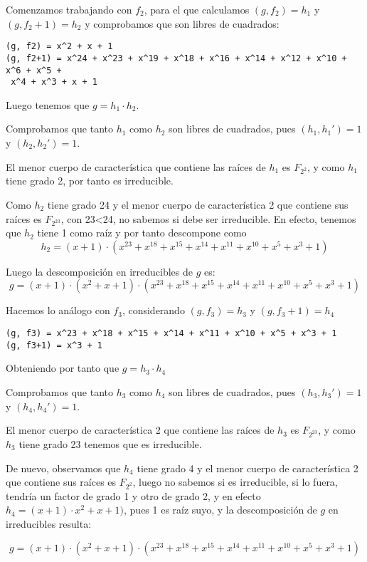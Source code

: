 \documentclass[a4paper]{article}
\begin{document}
Comenzamos trabajando con $f_2$, para el que calculamos $(g, f_2) =h_1$ y $(g, f_2+1)=h_2$ y comprobamos que son libres de cuadrados:

\begin{verbatim}
(g, f2) = x^2 + x + 1
(g, f2+1) = x^24 + x^23 + x^19 + x^18 + x^16 + x^14 + x^12 + x^10 + x^6 + x^5 +
 x^4 + x^3 + x + 1
\end{verbatim}

Luego tenemos que $g=h_1\cdot h_2$.

Comprobamos que tanto $h_1$ como $h_2$ son libres de cuadrados, pues $(h_1,h_1')=1$ y $(h_2,h_2')=1$.

El menor cuerpo  de característica que contiene las raíces de $h_1$ es $F_{2^{2}}$, y como $h_1$ tiene grado 2, por tanto es irreducible.

Como $h_2$ tiene grado 24 y el menor cuerpo de característica 2 que contiene sus raíces es $F_{2^{23}}$, con 23<24, no sabemos si debe ser irreducible. En efecto, tenemos que $h_2$ tiene 1 como raíz y por tanto descompone como 
$$h_2=(x+1)\cdot (x^{23}+x^{18}+x^{15}+x^{14}+x^{11}+x^{10}+x^5+x^3+1)$$

Luego la descomposición en irreducibles de $g$ es:
$$g=(x+1)\cdot (x^2+x+1) \cdot (x^{23}+x^{18}+x^{15}+x^{14}+x^{11}+x^{10}+x^5+x^3+1)$$

Hacemos lo análogo con $f_3$, considerando $(g, f_3) =h_3$ y $(g, f_3+1)=h_4$ 

\begin{verbatim}
(g, f3) = x^23 + x^18 + x^15 + x^14 + x^11 + x^10 + x^5 + x^3 + 1
(g, f3+1) = x^3 + 1
\end{verbatim}

Obteniendo por tanto que $g=h_3\cdot h_4$

Comprobamos que tanto $h_3$ como $h_4$ son libres de cuadrados, pues $(h_3,h_3')=1$ y $(h_4,h_4')=1$.

El menor cuerpo de característica 2 que contiene las raíces de $h_3$ es $F_{2^{23}}$, y como $h_3$ tiene grado 23 tenemos que es irreducible.

De nuevo, observamos que $h_4$ tiene grado 4 y el menor cuerpo de característica 2 que contiene sus raíces es $F_{2^{2}}$, luego no sabemos si es irreducible, si lo fuera, tendría un factor de grado 1 y otro de grado 2, y en efecto $h_4=(x+1)\cdot x^2+x+1)$, pues 1 es raíz suyo, y la descomposición de $g$ en irreducibles resulta:

$$g=(x+1)\cdot (x^2+x+1) \cdot (x^{23}+x^{18}+x^{15}+x^{14}+x^{11}+x^{10}+x^5+x^3+1)$$
\end{document}
